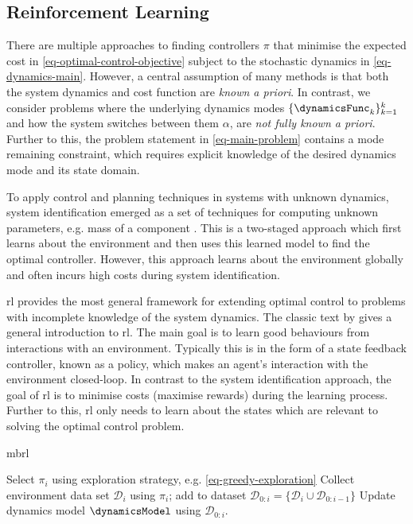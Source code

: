 \documentclass{mimosis-class/mimosis}
\numberwithin{equation}{chapter}
\newcommand{\modeInd}{\ensuremath{k}}
\newcommand{\ModeInd}{\ensuremath{\MakeUppercase{\modeInd}}}
\newcommand{\mode}[1]{\ensuremath{#1_{\modeInd}}}
\newcommand{\state}{\ensuremath{\mathbf{x}}}
\newcommand{\dataset}{\ensuremath{\mathcal{D}}}
\newcommand{\modeVar}{\ensuremath{\alpha}}
\begin{document}
\subsection{Reinforcement Learning}
\label{sec:orga39a8bf}
There are multiple approaches to finding controllers \(\pi\) that minimise the expected cost
in \cref{eq-optimal-control-objective} subject to the stochastic dynamics in \cref{eq-dynamics-main}.
However, a central assumption of many methods is that both the system dynamics and cost function are \emph{known a priori}.
In contrast, we consider problems where
the underlying dynamics modes \(\{\mode{\dynamicsFunc}\}_{\modeInd=1}^{\ModeInd}\)
and how the system switches between them \(\modeVar\), are \textit{not fully known a priori}.
Further to this, the problem statement in \cref{eq-main-problem} contains a mode remaining constraint,
which requires explicit knowledge of the desired dynamics mode and its state domain.

To apply control and planning techniques in systems with unknown dynamics,
system identification emerged as a set of techniques for computing unknown parameters, e.g. mass of a component
\citep{ljungSystem1999}.
This is a two-staged approach which first learns about the environment and then uses this
learned model to find the optimal controller.
However, this approach learns about the environment globally and often incurs high costs during system identification.

\acrfull{rl} provides the most general framework for extending optimal
control to problems with incomplete knowledge of the system dynamics.
The classic text by \cite{sutton2018reinforcement} gives a general introduction to \acrshort{rl}.
The main goal is to learn good behaviours from interactions with an environment.
Typically this is in the form of a state feedback controller, known as a policy, which makes an agent's interaction
with the environment closed-loop.
In contrast to the system identification approach,
the goal of \acrshort{rl} is to minimise costs (maximise rewards) during the learning process.
Further to this, \acrshort{rl} only needs to learn about the states which are relevant to solving
the optimal control problem.

\begin{algorithm}[!t]
\caption{\acrfull{mbrl}}\label{alg-mbrl-background}
\begin{algorithmic}[1]
\Require{Policy/controller $\policy_0$, dynamics model $\dynamicsModel$, start state $\state_0$}
    \State Select $\pi_i$ using exploration strategy, e.g. \cref{eq-greedy-exploration}
    \State Collect environment data set $\dataset_i$ using $\pi_i$; add to dataset $\dataset_{0:i} = \{\dataset_{i} \cup \dataset_{0:i-1}\}$
    \State Update dynamics model $\dynamicsModel$ using $\dataset_{0:i}$.
\EndFor
\end{algorithmic}
\end{algorithm}
\end{document}
